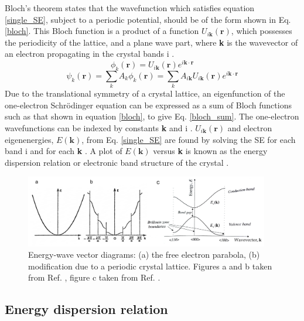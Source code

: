 \documentclass[11pt, twoside]{report}
\begin{document}
Bloch's theorem states that the wavefunction which satisfies equation \ref{single_SE}, subject to a periodic potential, should be of the form shown in Eq. \ref{bloch}. This Bloch function is a product of a function $U_{i\mathbf{k}}(\mathbf{r})$, which possesses the periodicity of the lattice, and a plane wave part, where \textbf{k} is the wavevector of an electron propagating in the crystal bands i \cite{Nelson3}.
\begin{equation} \label{bloch}
\phi_k(\mathbf{r}) = U_{i\mathbf{k}}(\mathbf{r}) e^{i\mathbf{k \cdot r}} 
\end{equation}
\begin{equation} \label{bloch_sum}
\psi_k(\mathbf{r}) = \sum_k A_k \phi_k(\mathbf{r}) = \sum_k A_{i\mathbf{k}}U_{i\mathbf{k}}(\mathbf{r}) e^{i\mathbf{k \cdot r}} 
\end{equation}
Due to the translational symmetry of a crystal lattice, an eigenfunction of the one-electron Schr{\"o}dinger equation can be expressed as a sum of Bloch functions such as that shown in equation \ref{bloch}, to give Eq. \ref{bloch_sum}. The one-electron wavefunctions can be indexed by constants \textbf{k} and i \cite{fund_semi}. 
$U_{i\mathbf{k}}(\mathbf{r})$ and electron eigenenergies, $E(\mathbf{k})$, from Eq. \ref{single_SE} are found by solving the SE for each band i and for each \textbf{k} \cite{Nelson3}.
A plot of $E(\textbf{k})$ versus \textbf{k} is known as the energy dispersion relation or electronic band structure of the crystal \cite{fund_semi}.
\begin{figure}[h!]
  \centering
    \includegraphics[width=0.95\textwidth]{figures/bs1_2.png}
    \caption[Energy-wave vector diagrams: (a) the free electron parabola, (b) modification due to a periodic crystal lattice.]{Energy-wave vector diagrams: (a) the free electron parabola, (b) modification due to a periodic crystal lattice. Figures a and b taken from Ref. , figure c taken from Ref. .}
  \label{bs1}
\end{figure}

\subsection{Energy dispersion relation}
\end{document}
